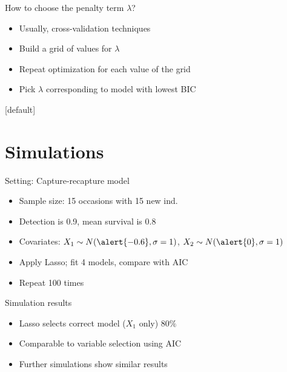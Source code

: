 \documentclass[14pt]{beamer}
\begin{document}
\begin{frame}[fragile]{How to choose the penalty term $\lambda$?}

\begin{itemize}
\item Usually, cross-validation techniques
\item Build a grid of values for $\lambda$
\item Repeat optimization for each value of the grid
\item Pick $\lambda$ corresponding to model with lowest BIC
\end{itemize}

\end{frame}

[default]

\section{Simulations}


\begin{frame}[fragile]{Setting: Capture-recapture model}

\begin{itemize}
\item Sample size: 15 occasions with 15 new ind.
\item Detection is 0.9, mean survival is 0.8
\item Covariates: $X_1 \sim N(\alert{-0.6},\sigma=1)$, $X_2 \sim N(\alert{0},\sigma=1)$
\item Apply Lasso; fit 4 models, compare with AIC
\item Repeat 100 times
\end{itemize}


\end{frame}

\begin{frame}[fragile]{Simulation results}

\begin{itemize}
\item Lasso selects correct model ($X_1$ only) $80\%$ 
\item Comparable to variable selection using AIC
\item Further simulations show similar results
\end{itemize}

\end{frame}
\end{document}
